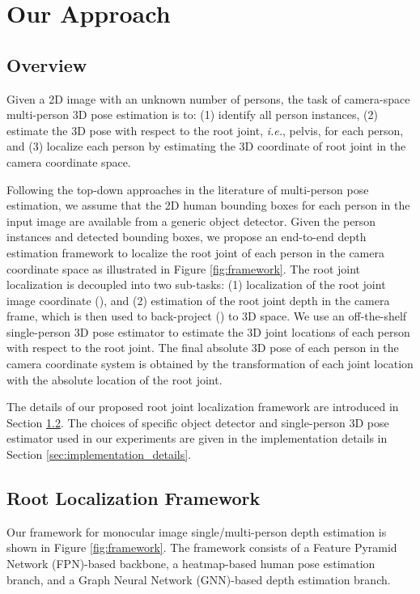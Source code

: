 \documentclass[runningheads]{llncs}
\begin{document}
\section{Our Approach}

\subsection {Overview}
Given a 2D image with an unknown number of persons, the task of camera-space multi-person 3D pose estimation is to: (1) identify all person instances, (2) estimate the 3D pose with respect to the root joint, \textit{i.e.}, pelvis, for each person, and (3) localize each person by estimating the 3D coordinate of root joint in the camera coordinate space.

Following the top-down approaches in the literature of multi-person pose estimation, we assume that the 2D human bounding boxes for each person in the input image are available from a generic object detector.
Given the person instances and detected bounding boxes, we propose an end-to-end depth estimation framework to localize the root joint of each person in the camera coordinate space as illustrated in Figure \ref{fig:framework}. The root joint localization is decoupled into two sub-tasks: (1) localization of the root joint image coordinate (), and (2) estimation of the root joint depth  in the camera frame, which is then used to back-project () to 3D space.
We use an off-the-shelf single-person 3D pose estimator to estimate the 3D joint locations of each person with respect to the root joint.
The final absolute 3D pose of each person in the camera coordinate system is obtained by the transformation of each joint location with the absolute location of the root joint.

The details of our proposed root joint localization framework are introduced in Section \ref{sec:root_localization_framework}. The choices of specific object detector and single-person 3D pose estimator used in our experiments are given in the implementation details in Section \ref{sec:implementation_details}.

\subsection{Root Localization Framework}
\label{sec:root_localization_framework}

Our framework for monocular image single/multi-person depth estimation is shown in Figure \ref{fig:framework}. The framework consists of a Feature Pyramid Network (FPN)-based backbone, a heatmap-based human pose estimation branch, and a Graph Neural Network (GNN)-based depth estimation branch.
\end{document}
